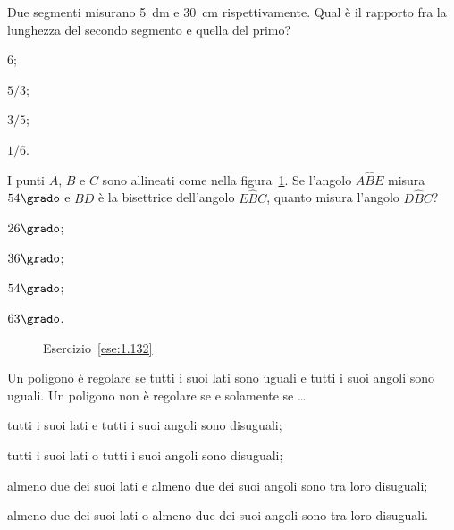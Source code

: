 \begin{esercizio}
\label{ese:1.131}
Due segmenti misurano 5~dm e 30~cm rispettivamente. Qual è il 
rapporto fra la lunghezza del secondo segmento e quella del primo?
\begin{multicols}{4}
\begin{enumeratea}
\item 6;
\item $5/3$;
\item $3/5$;
\item $1/6$.
\end{enumeratea}
\end{multicols}
\end{esercizio}

\begin{esercizio}
\label{ese:1.132}
I punti $A$, $B$ e $C$ sono allineati come nella 
figura~\ref{fig:ese1.132}. Se l'angolo $A\widehat{B}E$ misura 
$54\grado$ e $BD$ è la bisettrice dell'angolo $E\widehat{B}C$, quanto 
misura l'angolo $D\widehat{B}C$?
\begin{multicols}{4}
\begin{enumeratea}
\item $26\grado$;
\item $36\grado$;
\item $54\grado$;
\item $63\grado$.
\end{enumeratea}
\end{multicols}
\end{esercizio}


\begin{inaccessibleblock}
 \begin{figure}[htb]
 \centering
 \caption{Esercizio~\ref{ese:1.132}}\label{fig:ese1.132}
\end{figure}
\end{inaccessibleblock}


\begin{esercizio}
\label{ese:1.133}
Un poligono è regolare se tutti i suoi lati sono uguali e tutti i 
suoi angoli sono uguali. Un poligono non è regolare se e solamente se 
\ldots
\begin{enumeratea}
\item tutti i suoi lati e tutti i suoi angoli sono disuguali;
\item tutti i suoi lati o tutti i suoi angoli sono disuguali;
\item almeno due dei suoi lati e almeno due dei suoi angoli sono tra 
loro disuguali;
\item almeno due dei suoi lati o almeno due dei suoi angoli sono tra 
loro disuguali.
\end{enumeratea}
\end{esercizio}


